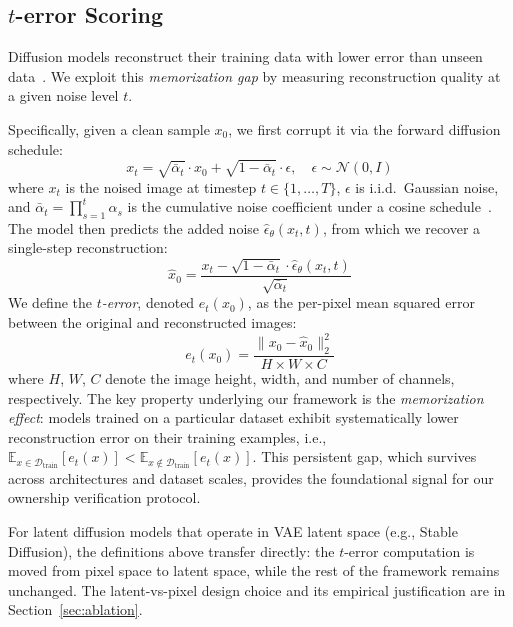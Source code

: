 \documentclass{article}
\begin{document}
\subsection{$t$-error Scoring}
\label{sec:t_error}

Diffusion models reconstruct their training data with lower error than unseen data~\citep{carlini2023extracting}. We exploit this \emph{memorization gap} by measuring reconstruction quality at a given noise level $t$.

Specifically, given a clean sample $x_0$, we first corrupt it via the forward diffusion schedule:
\begin{equation}
x_t = \sqrt{\bar{\alpha}_t} \cdot x_0 + \sqrt{1 - \bar{\alpha}_t} \cdot \epsilon, \quad \epsilon \sim \mathcal{N}(0, I)
\end{equation}
where $x_t$ is the noised image at timestep $t \in \{1,\ldots,T\}$, $\epsilon$ is i.i.d.\ Gaussian noise, and $\bar{\alpha}_t = \prod_{s=1}^{t} \alpha_s$ is the cumulative noise coefficient under a cosine schedule~\citep{dhariwal2021diffusion}. The model then predicts the added noise $\hat{\epsilon}_\theta(x_t, t)$, from which we recover a single-step reconstruction:
\begin{equation}
\hat{x}_0 = \frac{x_t - \sqrt{1 - \bar{\alpha}_t} \cdot \hat{\epsilon}_\theta(x_t, t)}{\sqrt{\bar{\alpha}_t}}
\end{equation}
We define the \emph{$t$-error}, denoted $e_t(x_0)$, as the per-pixel mean squared error between the original and reconstructed images:
\begin{equation}
e_t(x_0) = \frac{\|x_0 - \hat{x}_0\|_2^2}{H \times W \times C}
\end{equation}
where $H$, $W$, $C$ denote the image height, width, and number of channels, respectively. The key property underlying our framework is the \emph{memorization effect}: models trained on a particular dataset exhibit systematically lower reconstruction error on their training examples, i.e., $\mathbb{E}_{x \in \mathcal{D}_{\mathrm{train}}}[e_t(x)] < \mathbb{E}_{x \notin \mathcal{D}_{\mathrm{train}}}[e_t(x)]$. This persistent gap, which survives across architectures and dataset scales, provides the foundational signal for our ownership verification protocol.

For latent diffusion models that operate in VAE latent space (e.g., Stable Diffusion), the definitions above transfer directly: the $t$-error computation is moved from pixel space to latent space, while the rest of the framework remains unchanged. The latent-vs-pixel design choice and its empirical justification are in Section~\ref{sec:ablation}.
\end{document}
